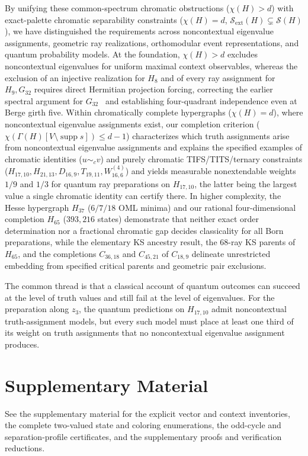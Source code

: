 \documentclass[aps,pra,reprint,superscriptaddress,longbibliography,nofootinbib,floatfix,10pt]{revtex4-2}
\theoremstyle{definition}\newtheorem{definition}[theorem]{Definition}
\theoremstyle{remark}\newtheorem{remark}[theorem]{Remark}
\newcommand{\Sc}{\mathcal S}\newcommand{\Cc}{\mathcal C}
\DeclareMathOperator{\supp}{supp}\DeclareMathOperator{\conv}{conv}
\begin{document}
By unifying these common-spectrum chromatic obstructions ($\chi(H)>d$) with exact-palette chromatic separability constraints ($\chi(H)=d$, $\Sc_{\mathrm{ext}}(H)\subsetneq\Sc(H)$), we have distinguished the requirements across noncontextual eigenvalue assignments, geometric ray realizations, orthomodular event representations, and quantum probability models. At the foundation, $\chi(H)>d$ excludes noncontextual eigenvalues for uniform maximal context observables, whereas the exclusion of an injective realization for $H_8$ and of every ray assignment for $H_9,G_{32}$ requires direct Hermitian projection forcing, correcting the earlier spectral argument for $G_{32}$~\cite{svozil-2021-chroma} and establishing four-quadrant independence even at Berge girth five. Within chromatically complete hypergraphs ($\chi(H)=d$), where noncontextual eigenvalue assignments exist, our completion criterion ($\chi(\Gamma(H)[V\setminus\supp s])\le d-1$) characterizes which truth assignments arise from noncontextual eigenvalue assignments and explains the specified examples of chromatic identities ($u\sim_c v$) and purely chromatic TIFS/TITS/ternary constraints ($H_{17,10},H_{21,13},D_{16,9},T_{19,11},W_{16,6}^{(4)}$) and yields measurable nonextendable weights $1/9$ and $1/3$ for quantum ray preparations on $H_{17,10}$, the latter being the largest value a single chromatic identity can certify there. In higher complexity, the Hesse hypergraph $H_{37}$ ($6/7/18$ OML minima) and our rational four-dimensional completion $H_{65}$ ($393{,}216$ states) demonstrate that neither exact order determination nor a fractional chromatic gap decides classicality for all Born preparations, while the elementary KS ancestry result, the $68$-ray KS parents of $H_{65}$, and the completions $C_{36,18}$ and $C_{45,21}$ of $C_{18,9}$ delineate unrestricted embedding from specified critical parents and geometric pair exclusions.

The common thread is that a classical account of quantum outcomes can succeed at the level of truth values and still fail at the level of eigenvalues. For the preparation along $z_3$, the quantum predictions on $H_{17,10}$ admit noncontextual truth-assignment models, but every such model must place at least one third of its weight on truth assignments that no noncontextual eigenvalue assignment produces.

\section*{Supplementary Material}
See the supplementary material for the explicit vector and context inventories, the complete two-valued state and coloring enumerations, the odd-cycle and separation-profile certificates, and the supplementary proofs and verification reductions.
\end{document}
